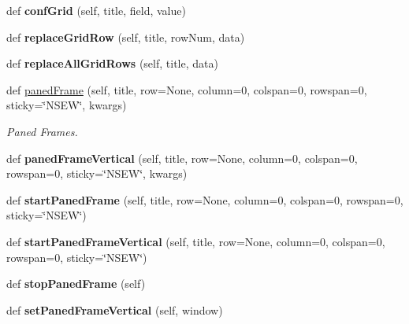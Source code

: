 \begin{DoxyCompactItemize}
def {\bfseries conf\+Grid} (self, title, field, value)
\item 
\mbox{\label{classappjar_1_1gui_afed44b0340a85f6329addf594508e787}} 
def {\bfseries replace\+Grid\+Row} (self, title, row\+Num, data)
\item 
\mbox{\label{classappjar_1_1gui_a55285734766e0d48ec95765e314b82b0}} 
def {\bfseries replace\+All\+Grid\+Rows} (self, title, data)
\item 
\mbox{\label{classappjar_1_1gui_a48edcd64f9c5bd393cc4ead8dc4a0a11}} 
def \hyperlink{classappjar_1_1gui_a48edcd64f9c5bd393cc4ead8dc4a0a11}{paned\+Frame} (self, title, row=None, column=0, colspan=0, rowspan=0, sticky=\char`\"{}N\+S\+EW\char`\"{}, kwargs)
\begin{DoxyCompactList}\small\item\em Paned Frames. \end{DoxyCompactList}\item 
\mbox{\label{classappjar_1_1gui_a40a648445cb60102dd965936fb645c29}} 
def {\bfseries paned\+Frame\+Vertical} (self, title, row=None, column=0, colspan=0, rowspan=0, sticky=\char`\"{}N\+S\+EW\char`\"{}, kwargs)
\item 
\mbox{\label{classappjar_1_1gui_a59385664f1477244c91ddbc716883c44}} 
def {\bfseries start\+Paned\+Frame} (self, title, row=None, column=0, colspan=0, rowspan=0, sticky=\char`\"{}N\+S\+EW\char`\"{})
\item 
\mbox{\label{classappjar_1_1gui_aa68193c79ad0e5a8c30a5c63c272e84d}} 
def {\bfseries start\+Paned\+Frame\+Vertical} (self, title, row=None, column=0, colspan=0, rowspan=0, sticky=\char`\"{}N\+S\+EW\char`\"{})
\item 
\mbox{\label{classappjar_1_1gui_afa30096083c5c05a39eb8f01a764cc14}} 
def {\bfseries stop\+Paned\+Frame} (self)
\item 
\mbox{\label{classappjar_1_1gui_aac22f3f6a6e2504c1645901640979cbb}} 
def {\bfseries set\+Paned\+Frame\+Vertical} (self, window)
\item 
\mbox{\label{classappjar_1_1gui_ae78726f154d59780830285b84bac5cd1}} 

\end{DoxyCompactItemize}
